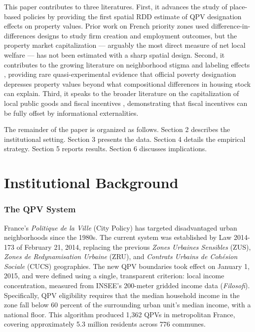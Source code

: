 \documentclass[12pt]{article}
\begin{document}
This paper contributes to three literatures. First, it advances the study of place-based policies by providing the first spatial RDD estimate of QPV designation effects on property values. Prior work on French priority zones used difference-in-differences designs to study firm creation \citep{mayer2017taxation} and employment outcomes, but the property market capitalization --- arguably the most direct measure of net local welfare --- has not been estimated with a sharp spatial design. Second, it contributes to the growing literature on neighborhood stigma and labeling effects \citep{galster2017people, lens2018neighborhood}, providing rare quasi-experimental evidence that official poverty designation depresses property values beyond what compositional differences in housing stock can explain. Third, it speaks to the broader literature on the capitalization of local public goods and fiscal incentives \citep{oates1969effects, brueckner1982economics, cellini2010value}, demonstrating that fiscal incentives can be fully offset by informational externalities.

The remainder of the paper is organized as follows. Section 2 describes the institutional setting. Section 3 presents the data. Section 4 details the empirical strategy. Section 5 reports results. Section 6 discusses implications.


\section{Institutional Background}

\subsubsection*{The QPV System} France's \textit{Politique de la Ville} (City Policy) has targeted disadvantaged urban neighborhoods since the 1980s. The current system was established by Law 2014-173 of February 21, 2014, replacing the previous \textit{Zones Urbaines Sensibles} (ZUS), \textit{Zones de Redynamisation Urbaine} (ZRU), and \textit{Contrats Urbains de Coh\'{e}sion Sociale} (CUCS) geographies. The new QPV boundaries took effect on January 1, 2015, and were defined using a single, transparent criterion: local income concentration, measured from INSEE's 200-meter gridded income data (\textit{Filosofi}). Specifically, QPV eligibility requires that the median household income in the zone fall below 60 percent of the surrounding urban unit's median income, with a national floor. This algorithm produced 1,362 QPVs in metropolitan France, covering approximately 5.3 million residents across 776 communes.
\end{document}
